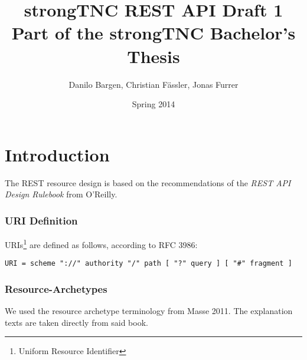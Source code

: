 \documentclass[10pt,a4paper]{scrartcl}
\author{Danilo Bargen, Christian Fässler, Jonas Furrer}
\title{strongTNC REST API Draft 1\\ \small{Part of the strongTNC Bachelor's Thesis} }
\date{Spring 2014}
\let\textquotedbl="
\begin{document}
\begin{titlepage}
	\maketitle
	\vspace{120mm}
	\thispagestyle{empty} %
\end{titlepage}

\newpage
	\tableofcontents
\newpage

\section{Introduction}

The REST resource design is based on the recommendations of the \textit{REST API
Design Rulebook}\cite{masse2011rest} from O'Reilly.

\subsubsection*{URI Definition}

URIs\footnote{Uniform Resource Identifier} are defined as follows, according to RFC 3986\cite{rfc3986}:

\texttt{URI = scheme \textquotedbl ://\textquotedbl{} authority \textquotedbl /\textquotedbl{}
path [ \textquotedbl ?\textquotedbl{} query ] [ \textquotedbl \#\textquotedbl{} fragment ]}

\subsubsection*{Resource-Archetypes}

We used the resource archetype terminology from Masse 2011\cite{masse2011rest}.
The explanation texts are taken directly from said book.
\end{document}
